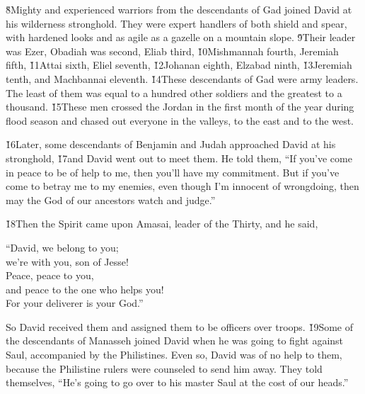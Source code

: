 \v{8}Mighty and experienced warriors from the descendants of Gad joined David at his wilderness stronghold. They were expert handlers of both shield and spear, with hardened looks and as agile as a gazelle on a mountain slope. \v{9}Their leader was Ezer, Obadiah was second, Eliab third, \v{10}Mishmannah fourth, Jeremiah fifth, \v{11}Attai sixth, Eliel seventh, \v{12}Johanan eighth, Elzabad ninth, \v{13}Jeremiah tenth, and Machbannai eleventh. \v{14}These descendants of Gad were army leaders. The least of them was equal to a hundred other soldiers and the greatest to a thousand. \v{15}These men crossed the Jordan in the first month of the year during flood season and chased out everyone in the valleys, to the east and to the west.

\v{16}Later, some descendants of Benjamin and Judah approached David at his stronghold, \v{17}and David went out to meet them. He told them, ``If you've come in peace to be of help to me, then you'll have my commitment. But if you've come to betray me to my enemies, even though I'm innocent of wrongdoing, then may the God of our ancestors watch and judge.''

\v{18}Then the Spirit came upon Amasai, leader of the Thirty, and he said,

\begin{poetry}
\poeml ``David, we belong to you; \\
\poemll    we're with you, son of Jesse! \\
\poeml Peace, peace to you, \\
\poemll    and peace to the one who helps you! \\
\poemlll       For your deliverer is your God.''
\end{poetry}

So David received them and assigned them to be officers over troops. \v{19}Some of the descendants of Manasseh joined David when he was going to fight against Saul, accompanied by the Philistines. Even so, David was of no help to them, because the Philistine rulers were counseled to send him away. They told themselves, ``He's going to go over to his master Saul at the cost of our heads.''

